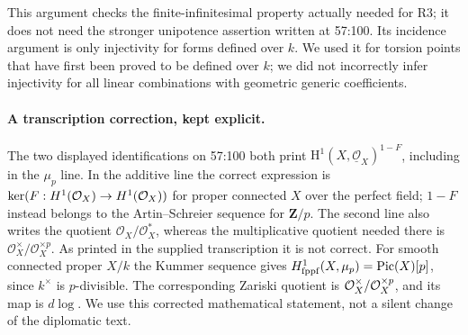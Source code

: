 This argument checks the finite-infinitesimal property actually needed
for R3; it does not need the stronger unipotence assertion written at
57:100.  Its incidence argument is only injectivity for forms defined
over $k$.  We used it for torsion points that have first been proved to
be defined over $k$; we did not incorrectly infer injectivity for all
linear combinations with geometric generic coefficients.

\paragraph{A transcription correction, kept explicit.}
The two displayed identifications on 57:100 both print
$\mathrm H^1(X,\underline{\mathcal O}_X)^{1-F}$, including in
the $\mu_p$ line. In the additive line the correct expression is
$\ker(F:H^1(\mathcal O_X)\to H^1(\mathcal O_X))$ for proper connected
$X$ over the perfect field; $1-F$ instead belongs to the
Artin--Schreier sequence for $\mathbf Z/p$. The second line also
writes the quotient $\mathcal O_X/\mathcal O_X^*$, whereas the
multiplicative quotient needed there is
$\mathcal O_X^\times/\mathcal O_X^{\times p}$.  As printed in the supplied
transcription it is not correct.  For smooth connected proper $X/k$ the
Kummer sequence gives $H^1_{\mathrm{fppf}}(X,\mu_p)=\operatorname{Pic}(X)[p]$,
since $k^\times$ is $p$-divisible.  The corresponding Zariski quotient
is $\mathcal O_X^\times/\mathcal O_X^{\times p}$, and its map is $d\log$.
We use this corrected mathematical statement, not a silent change of
the diplomatic text.

